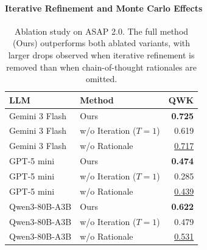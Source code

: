 \documentclass[11pt]{article}
\begin{document}
\paragraph{Iterative Refinement and Monte Carlo Effects}
\begin{table}[t]
\centering
\small
\begin{tabular}{llr}
\toprule
LLM & Method & QWK \\
\midrule
Gemini 3 Flash & Ours & \textbf{0.725} \\
Gemini 3 Flash & w/o Iteration ($T=1$) & 0.619 \\
Gemini 3 Flash & w/o Rationale & \underline{0.717} \\
\midrule
GPT-5 mini & Ours & \textbf{0.474} \\
GPT-5 mini & w/o Iteration ($T=1$) & 0.285 \\
GPT-5 mini & w/o Rationale & \underline{0.439} \\
\midrule
Qwen3-80B-A3B & Ours & \textbf{0.622} \\
Qwen3-80B-A3B & w/o Iteration ($T=1$) & 0.479 \\
Qwen3-80B-A3B & w/o Rationale & \underline{0.531} \\
\bottomrule
\end{tabular}
\caption{Ablation study on ASAP 2.0. The full method (Ours) outperforms both ablated variants, with larger drops observed when iterative refinement is removed than when chain-of-thought rationales are omitted.}
\label{tab:ablation}
\end{table}
\end{document}

